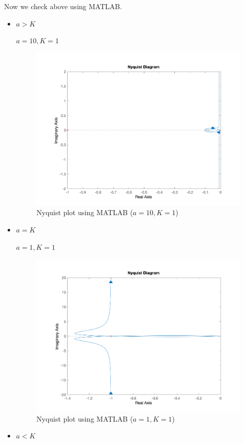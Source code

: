 Now we check above using MATLAB.
\begin{itemize}
	\item $a>K$
	
	$a = 10, K = 1$
	\begin{figure}[H]
		\caption{Nyquist plot using MATLAB ($a = 10, K = 1$)}
		\centering
		\includegraphics[width=12cm]{../Figure/Q2/MATAB-Nyquist_a_bigger.png}
	\end{figure}
	\item $a = K$
	
	$a = 1, K = 1$
	\begin{figure}[H]
		\caption{Nyquist plot using MATLAB ($a = 1, K = 1$)}
		\centering
		\includegraphics[width=12cm]{../Figure/Q2/MATAB-Nyquist.png}
	\end{figure}
	\item $a<K$
	

\end{itemize}
